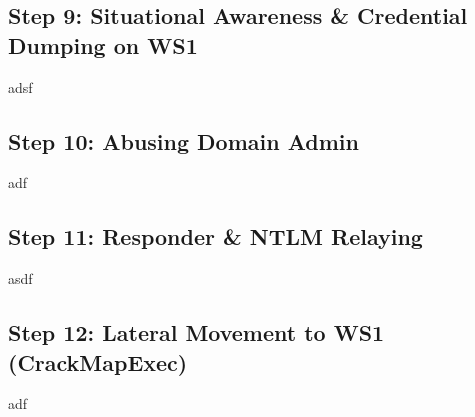 \subsection{Step 9: Situational Awareness \& Credential Dumping on WS1}
adsf

\subsection{Step 10: Abusing Domain Admin}
adf

\subsection{Step 11: Responder \& NTLM Relaying}
asdf

\subsection{Step 12: Lateral Movement to WS1 (CrackMapExec)}
adf